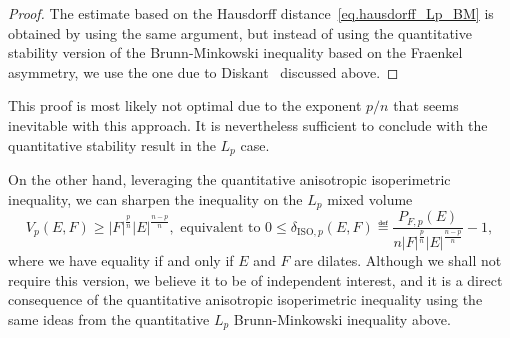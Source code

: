 \documentclass[a4paper, 10pt, twoside]{amsart}
\numberwithin{equation}{section}
\theoremstyle{plain}
\theoremstyle{definition}
\begin{document}
\begin{proof}
    The estimate based on the Hausdorff distance~\eqref{eq.hausdorff_Lp_BM} is obtained by using the same argument, but instead of using the quantitative stability version of the Brunn-Minkowski inequality based on the Fraenkel asymmetry, we use the one due to Diskant~\cite{diskant1973stability} discussed above. 
\end{proof}
This proof is most likely not optimal due to the exponent $p/n$ that seems inevitable with this approach. It is nevertheless sufficient to conclude with the quantitative stability result in the $L_p$ case.

On the other hand, leveraging the quantitative anisotropic isoperimetric inequality, we can sharpen the inequality on the $L_p$ mixed volume
\begin{equation}\label{eq.Lp_Minkowski_inequality}
    V_p(E,F) \ge 
    |F|^{\frac{p}{n}}{|E|}^{\frac{n-p}{n}},
    \text{ equivalent to }
    0\le 
    \delta_{\text{ISO},p}(E,F) 
    \eqdef 
    \frac{P_{F,p}(E)}{
        n|F|^{\frac{p}{n}}{|E|}^{\frac{n-p}{n}}
    } - 1,
\end{equation}
where we have equality if and only if $E$ and $F$ are dilates. Although we shall not require this version, we believe it to be of independent interest, and it is a direct consequence of the quantitative anisotropic isoperimetric inequality using the same ideas from the quantitative $L_p$ Brunn-Minkowski inequality above. 


\end{document}
